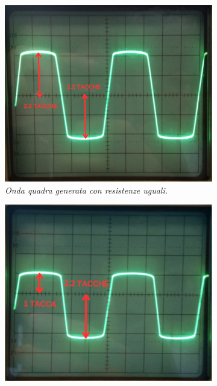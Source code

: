  \begin{figure}[H]
   \centering
      \begin{subfigure}{0.3\textwidth}
        \centering
        \includegraphics[width=\textwidth]{../assets/Resistenze_Uguali.png}
        \caption{\emph{Onda quadra generata con resistenze uguali.}}
        \label{fig : resistenze uguali}
      \end{subfigure}
      \hfill
      \begin{subfigure}{0.3\textwidth}
        \centering
        \includegraphics[width=\textwidth]{../assets/Resistenze_Diverse.png}

\end{subfigure}
\end{figure}
